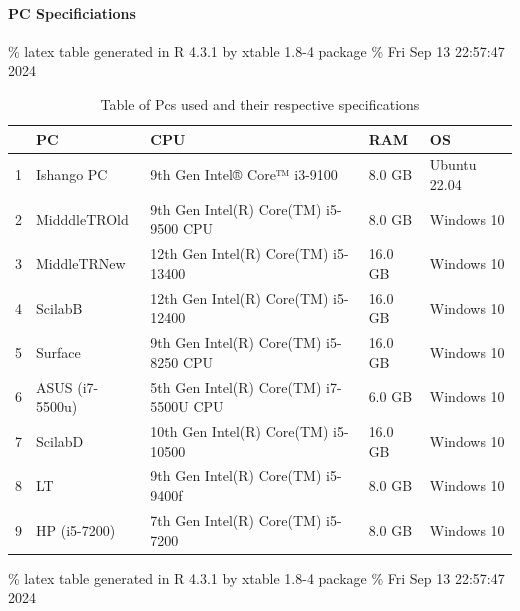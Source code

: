 \documentclass[12pt,halfline,a4paper,]{ouparticle}
\begin{document}
\hypertarget{pc-specificiations}{%
\paragraph{PC Specificiations}\label{pc-specificiations}}

\hfill\break
\% latex table generated in R 4.3.1 by xtable 1.8-4 package \% Fri Sep
13 22:57:47 2024

\begin{table}[ht]
\centering
\begin{tabular}{rllll}
  \hline
 & PC & CPU & RAM & OS \\ 
  \hline
1 & Ishango PC &  9th Gen Intel® Core™ i3-9100  &  8.0 GB  & Ubuntu 22.04 \\ 
  2 & MidddleTROld &  9th Gen Intel(R) Core(TM) i5-9500 CPU  &  8.0 GB  &   Windows 10 \\ 
  3 & MiddleTRNew  &  12th Gen Intel(R) Core(TM) i5-13400  &  16.0 GB  &   Windows 10 \\ 
  4 & ScilabB  &   12th Gen Intel(R) Core(TM) i5-12400  &   16.0 GB   &   Windows 10 \\ 
  5 & Surface  &   9th Gen Intel(R) Core(TM) i5-8250 CPU  &   16.0 GB   &   Windows 10 \\ 
  6 & ASUS (i7-5500u)  &   5th Gen Intel(R) Core(TM) i7-5500U CPU  &   6.0 GB   &   Windows 10 \\ 
  7 & ScilabD  &   10th Gen Intel(R) Core(TM) i5-10500  &   16.0 GB   &   Windows 10 \\ 
  8 & LT  &   9th Gen Intel(R) Core(TM) i5-9400f  &   8.0 GB   &   Windows 10 \\ 
  9 & HP (i5-7200)  &   7th Gen Intel(R) Core(TM) i5-7200  &   8.0 GB   &   Windows 10 \\ 
   \hline
\end{tabular}
\caption{Table of Pcs used and their respective specifications} 
\end{table}

\% latex table generated in R 4.3.1 by xtable 1.8-4 package \% Fri Sep
13 22:57:47 2024
\end{document}
